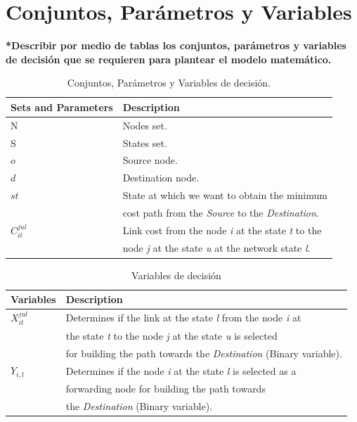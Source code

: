 \documentclass[runningheads]{llncs}
\begin{document}
\section{Conjuntos, Par\'{a}metros y Variables}

\textbf{*Describir por medio de tablas los conjuntos, par\'{a}metros y variables de decisi\'{o}n que se requieren para plantear el modelo matem\'{a}tico.}

\begin{table}[h]
	\caption{Conjuntos, Par\'{a}metros y Variables de decisi\'{o}n. \label{Tab: tab1}}
	\begin{tabular*}{\hsize}{@{\extracolsep{\fill}}ll@{}}
		\hline
		\textbf{Sets and Parameters} & \textbf{Description}\\
		\hline
		N &   Nodes set.\\
		S  & States set. \\
		$o$  & Source node.\\
		$d$  & Destination node.\\
		$st$  & State at which we want to obtain the minimum  \\
		& cost path from the \textit{Source} to the \textit{Destination}.\\
		$C_{it}^{jul}$ & Link cost from the node \textit{i} at the state \textit{t} to the \\ 
		& node \textit{j} at the state \textit{u} at the network state \textit{l}.\\
		\hline
	\end{tabular*}
\end{table}

\begin{table}[h]
	\caption{Variables de decisi\'{o}n}
	\begin{tabular*}{\hsize}{@{\extracolsep{\fill}}ll@{}}
		\hline
		\textbf{Variables} & \textbf{Description}\\
		\hline
		$X_{it}^{jul}$ &  Determines if the link at the state \textit{l} from the node \textit{i} at  \\ 
		&  the state \textit{t} to the node \textit{j} at the state \textit{u} is selected \\
		&  for building the path towards the \textit{Destination} (Binary variable). \\
		$Y_{i,l}$ &  Determines if the node \textit{i} at the state \textit{l} is selected as a \\
		&  forwarding node for building the path towards \\
		&  the \textit{Destination} (Binary variable).\\
		\hline
	\end{tabular*}
\end{table}
\end{document}
